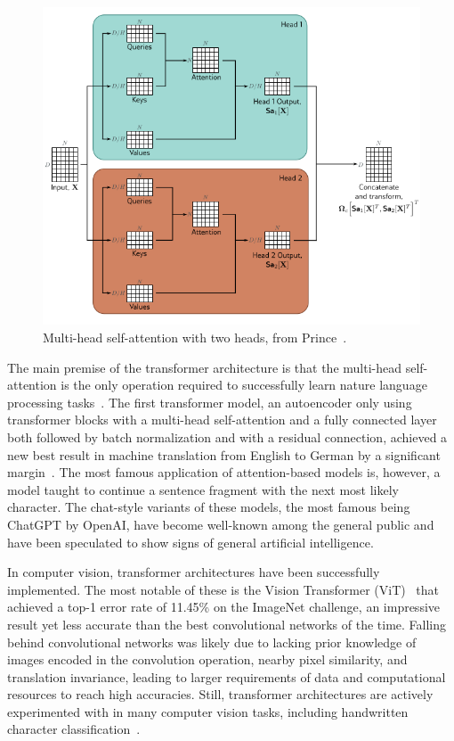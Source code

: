 \documentclass[english,twoside,openright]{UH_DS_MSc}
\begin{document}
\begin{figure}[ht]
    \centering
    \includegraphics*[scale=0.57]{images/multiheadattention.png}
    \caption{Multi-head self-attention with two heads, from Prince~\cite{princebook}.}
    \label{fig:multi-head-self-attention}
\end{figure}

The main premise of the transformer architecture is that the multi-head self-attention 
is the only operation required to successfully learn nature language processing tasks~\cite{attention_is_all_you_need}. The first transformer model,
an autoencoder only using transformer blocks with a multi-head self-attention and 
a fully connected layer both followed by batch normalization and with a residual connection, achieved a new best 
result in machine translation from English to German by a significant margin~\cite{attention_is_all_you_need}.
The most famous application of attention-based models is, however, a model taught to continue a sentence fragment with the next most 
likely character. The chat-style variants of these models, the most famous being ChatGPT by OpenAI, have become well-known among the general public and 
have been speculated to show signs of general artificial intelligence.

In computer vision, transformer architectures have been successfully implemented.
The most notable of these is the Vision Transformer (ViT)~\cite{vit} that achieved a top-1 error rate of
11.45\% on the ImageNet challenge, an impressive result yet less accurate than the best convolutional networks of the time.
Falling behind convolutional networks was likely due to lacking prior knowledge of images encoded in the convolution operation, nearby pixel similarity, and
translation invariance, leading to larger requirements of data and computational resources 
to reach high accuracies. Still, transformer architectures are actively experimented with in many computer vision tasks, including handwritten character classification~\cite{9thuonPalm}.
\end{document}
